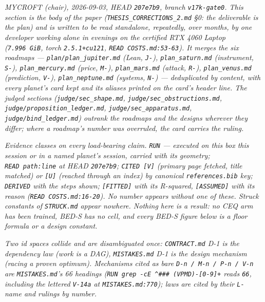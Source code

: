 \documentclass[11pt,a4paper]{article}
\theoremstyle{plain}
\theoremstyle{definition}
\theoremstyle{remark}
\begin{document}
\emph{MYCROFT (chair), 2026-09-03, HEAD \texttt{207e7b9}, branch
\texttt{v17k-gate0}. This section is the body of the paper
(\texttt{THESIS\_CORRECTIONS\_2.md} §0: the deliverable is the plan) and
is written to be read standalone, repeatedly, over months, by one
developer working alone in evenings on the certified RTX 4060 Laptop
(\texttt{7.996\ GiB}, torch \texttt{2.5.1+cu121},
\texttt{READ\ COSTS.md:53-63}). It merges the six roadmaps ---
\texttt{plan/plan\_jupiter.md} (Lean, \texttt{J-}),
\texttt{plan\_saturn.md} (instrument, \texttt{S-}),
\texttt{plan\_mercury.md} (price, \texttt{M-}), \texttt{plan\_mars.md}
(attack, \texttt{R-}), \texttt{plan\_venus.md} (prediction,
\texttt{V-}), \texttt{plan\_neptune.md} (systems, \texttt{N-}) ---
deduplicated by content, with every planet's card kept and its aliases
printed on the card's header line. The judged sections
(\texttt{judge/sec\_shape.md}, \texttt{judge/sec\_obstructions.md},
\texttt{judge/proposition\_ledger.md}, \texttt{judge/sec\_apparatus.md},
\texttt{judge/bind\_ledger.md}) outrank the roadmaps and the designs
wherever they differ; where a roadmap's number was overruled, the card
carries the ruling.}

\emph{Evidence classes on every load-bearing claim. \texttt{RUN} ---
executed on this box this session or in a named planet's session,
carried with its geometry; \texttt{READ\ path:line} at HEAD
\texttt{207e7b9}; \texttt{CITED\ {[}V{]}} (primary page fetched, title
matched) or \texttt{{[}U{]}} (reached through an index) by canonical
\texttt{references.bib} key; \texttt{DERIVED} with the steps shown;
\texttt{{[}FITTED{]}} with its R-squared, \texttt{{[}ASSUMED{]}} with
its reason (\texttt{READ\ COSTS.md:16-20}). No number appears without
one of these. Struck constants of \texttt{STRUCK.md} appear nowhere.
Nothing here is a result: no CEQ arm has been trained, BED-S has no
cell, and every BED-S figure below is a floor formula or a design
constant.}

\emph{Two id spaces collide and are disambiguated once:
\texttt{CONTRACT.md} D-1 is the dependency law (work is a DAG),
\texttt{MISTAKES.md} D-1 is the design mechanism (racing a proven
optimum). Mechanisms cited as bare \texttt{D-n\ /\ M-n\ /\ P-n\ /\ V-n}
are \texttt{MISTAKES.md}'s 66 headings
(\texttt{RUN\ grep\ -cE\ \textquotesingle{}\^{}\#\#\#\ (V\textbar{}P\textbar{}M\textbar{}D)-{[}0-9{]}+\textquotesingle{}}
reads \texttt{66}, including the lettered \texttt{V-14a} at
\texttt{MISTAKES.md:770}); laws are cited by their \texttt{L-} name and
rulings by number.}
\end{document}
